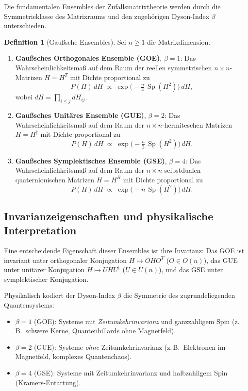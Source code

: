 \documentclass[12pt,a4paper]{amsart}
\theoremstyle{definition}
\newtheorem{definition}[theorem]{Definition}
\theoremstyle{remark}
\begin{document}
Die fundamentalen Ensembles der Zufallsmatrixtheorie werden durch die
Symmetrieklasse des Matrixraums und den zugehörigen Dyson-Index $\beta$
unterschieden.

\begin{definition}[Gaußsche Ensembles]
Sei $n \geq 1$ die Matrixdimension.
\begin{enumerate}[label=(\roman*)]
  \item \textbf{Gaußsches Orthogonales Ensemble (GOE)}, $\beta = 1$:
    Das Wahrscheinlichkeitsmaß auf dem Raum der reellen symmetrischen
    $n \times n$-Matrizen $H = H^T$ mit Dichte proportional zu
    \[
      P(H)\,dH \;\propto\; \exp\!\bigl(-\tfrac{n}{4}\,\operatorname{Sp}(H^2)\bigr)\,dH,
    \]
    wobei $dH = \prod_{i \leq j} dH_{ij}$.

  \item \textbf{Gaußsches Unitäres Ensemble (GUE)}, $\beta = 2$:
    Das Wahrscheinlichkeitsmaß auf dem Raum der $n \times n$-hermiteschen
    Matrizen $H = H^\dagger$ mit Dichte proportional zu
    \[
      P(H)\,dH \;\propto\; \exp\!\bigl(-\tfrac{n}{2}\,\operatorname{Sp}(H^2)\bigr)\,dH.
    \]

  \item \textbf{Gaußsches Symplektisches Ensemble (GSE)}, $\beta = 4$:
    Das Wahrscheinlichkeitsmaß auf dem Raum der $n \times n$-selbstdualen
    quaternionischen Matrizen $H = H^R$ mit Dichte proportional zu
    \[
      P(H)\,dH \;\propto\; \exp\!\bigl(-n\,\operatorname{Sp}(H^2)\bigr)\,dH.
    \]
\end{enumerate}
\end{definition}

\subsection{Invarianzeigenschaften und physikalische Interpretation}

Eine entscheidende Eigenschaft dieser Ensembles ist ihre Invarianz:
Das GOE ist invariant unter orthogonaler Konjugation $H \mapsto O H O^T$
($O \in O(n)$), das GUE unter unitärer Konjugation $H \mapsto U H U^\dagger$
($U \in U(n)$), und das GSE unter symplektischer Konjugation.

Physikalisch kodiert der Dyson-Index $\beta$ die Symmetrie des zugrundeliegenden
Quantensystems:
\begin{itemize}
  \item $\beta = 1$ (GOE): Systeme mit \emph{Zeitumkehrinvarianz} und
    ganzzahligem Spin (z.\,B.\ schwere Kerne, Quantenbillards ohne Magnetfeld).
  \item $\beta = 2$ (GUE): Systeme \emph{ohne} Zeitumkehrinvarianz
    (z.\,B.\ Elektronen im Magnetfeld, komplexes Quantenchaos).
  \item $\beta = 4$ (GSE): Systeme mit Zeitumkehrinvarianz und halbzahligem Spin
    (Kramers-Entartung).
\end{itemize}
\end{document}
